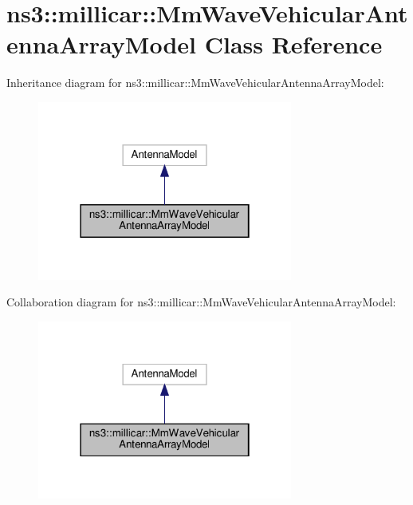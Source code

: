 \hypertarget{classns3_1_1millicar_1_1MmWaveVehicularAntennaArrayModel}{}\section{ns3\+:\+:millicar\+:\+:Mm\+Wave\+Vehicular\+Antenna\+Array\+Model Class Reference}
\label{classns3_1_1millicar_1_1MmWaveVehicularAntennaArrayModel}


Inheritance diagram for ns3\+:\+:millicar\+:\+:Mm\+Wave\+Vehicular\+Antenna\+Array\+Model\+:\nopagebreak
\begin{figure}[H]
\begin{center}
\leavevmode
\includegraphics[width=238pt]{classns3_1_1millicar_1_1MmWaveVehicularAntennaArrayModel__inherit__graph}
\end{center}
\end{figure}


Collaboration diagram for ns3\+:\+:millicar\+:\+:Mm\+Wave\+Vehicular\+Antenna\+Array\+Model\+:\nopagebreak
\begin{figure}[H]
\begin{center}
\leavevmode
\includegraphics[width=238pt]{classns3_1_1millicar_1_1MmWaveVehicularAntennaArrayModel__coll__graph}
\end{center}
\end{figure}
